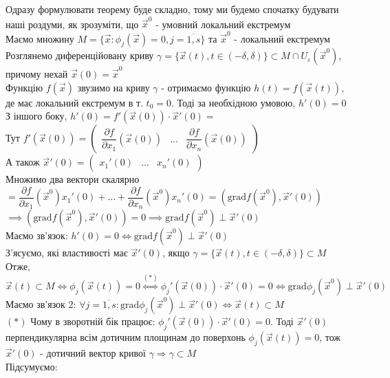 \documentclass[a4paper, 10pt]{article}
\def\departial#1#2{\dfrac{\partial {#1}}{\partial {#2}}}
\def\bigline{\vspace{5mm}\\}
\theoremstyle{theoremdd}
\theoremstyle{theoremdd}
\theoremstyle{theoremdd}
\theoremstyle{theoremdd}
\theoremstyle{theoremdd}
\theoremstyle{theoremdd}
\theoremstyle{theoremdd}
\theoremstyle{theoremdd}
\theoremstyle{theoremdd}
\begin{document}
Одразу формулювати теорему буде складно, тому ми будемо спочатку будувати наші роздуми, як зрозуміти, що $\vec{x}^0$ - умовний локальний екстремум
\bigline
Маємо множину $M=\{\vec{x}: \phi_j(\vec{x}) = 0, j=\overline{1,s} \}$ та $\vec{x}^0$ - локальний екстремум\\
Розглянемо диференційовану криву $\gamma = \{\vec{x}(t), t \in (-\delta, \delta )\} \subset M \cap U_{\varepsilon}(\vec{x}^0)$, причому нехай $\vec{x}(0) = \vec{x}^0$\\
Функцію $f(\vec{x})$ звузимо на криву $\gamma$ - отримаємо функцію $h(t) = f(\vec{x}(t))$, де має локальний екстремум в т. $t_0 = 0$. Тоді за необхідною умовою, $h'(0) = 0$\\
З іншого боку, $h'(0) = f'(\vec{x}(0)) \cdot \vec{x}'(0) \boxed{=}$\\
Тут $f'(\vec{x}(0)) = \begin{pmatrix}
\departial{f}{x_1}(\vec{x}(0)) & \dots & \departial{f}{x_n}(\vec{x}(0))
\end{pmatrix}$\\
А також $\vec{x}'(0) = \begin{pmatrix}
x_1'(0) & \dots & x_n'(0)
\end{pmatrix}$\\
Множимо два вектори скалярно\\
$\boxed{=} \departial{f}{x_1}(\vec{x}^0) x_1'(0) + \dots + \departial{f}{x_n}(\vec{x}^0) x_n'(0) = (\textrm{grad} f(\vec{x}^0), \vec{x}'(0))$\\
$\implies (\textrm{grad} f(\vec{x}^0), \vec{x}'(0)) = 0 \implies \textrm{grad} f(\vec{x}^0) \perp \vec{x}'(0)$\\
Маємо зв'язок: $h'(0) = 0 \iff \textrm{grad} f(\vec{x}^0) \perp \vec{x}'(0)$
\bigline
З'ясуємо, які властивості має $\vec{x}'(0)$, якщо $\gamma = \{\vec{x}(t), t \in (-\delta, \delta)\} \subset M$\\
Отже, $\vec{x}(t) \subset M \iff \phi_j(\vec{x}(t)) = 0 \overset{(*)}{\iff} \phi_j'(\vec{x}(0)) \cdot \vec{x}'(0) = 0 \iff  \textrm{grad} \phi_j(\vec{x}^0) \perp \vec{x}'(0)$\\
Маємо зв'язок 2: $\forall j=\overline{1,s}: \textrm{grad} \phi_j(\vec{x}^0) \perp \vec{x}'(0) \iff \vec{x}(t) \subset M$\\
$(*)$ Чому в зворотній бік працює: $\phi_j'(\vec{x}(0)) \cdot \vec{x}'(0) = 0$. Тоді $\vec{x}'(0)$ перпендикулярна всім дотичним площинам до поверхонь $\phi_j(\vec{x}(t)) = 0$, тож $\vec{x}'(0)$ - дотичний вектор кривої $\gamma \Rightarrow \gamma \subset M$
\bigline
Підсумуємо:\\
\end{document}
